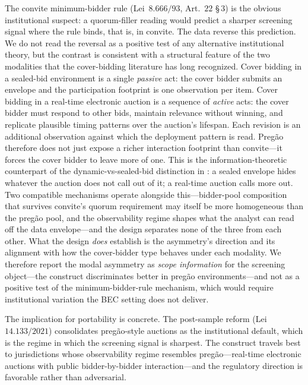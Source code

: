 The convite minimum-bidder rule
(Lei~$8.666/93$, Art.~$22$ \S\,$3$) is the obvious institutional
suspect: a quorum-filler reading would predict a sharper
screening signal where the rule binds, that is, in convite. The
data reverse this prediction. We do not read the reversal as a
positive test of any alternative institutional theory, but the
contrast is consistent with a structural feature of the two
modalities that the cover-bidding literature has long
recognized. Cover bidding in a sealed-bid environment is a
single \emph{passive} act: the cover bidder submits an envelope
and the participation footprint is one observation per item.
Cover bidding in a real-time electronic auction is a sequence
of \emph{active} acts: the cover bidder must respond to other
bids, maintain relevance without winning, and replicate
plausible timing patterns over the auction's lifespan. Each
revision is an additional observation against which the
deployment pattern is read. Pregão therefore does not just
expose a richer interaction footprint than convite---it forces
the cover bidder to leave more of one. This is the
information-theoretic counterpart of the dynamic-vs-sealed-bid
distinction in
\citet{marshall2012economics,asker2010leniency,athey2011comparing}:
a sealed envelope hides whatever the auction does not call out
of it; a real-time auction calls more out. Two compatible
mechanisms operate alongside this---bidder-pool composition
that survives convite's quorum requirement may itself be more
homogeneous than the pregão pool, and the observability regime
shapes what the analyst can read off the data envelope---and
the design separates none of the three from each other. What
the design \emph{does} establish is the asymmetry's direction
and its alignment with how the cover-bidder type behaves under
each modality. We therefore report the modal asymmetry as
\emph{scope information} for the screening object---the
construct discriminates better in pregão environments---and
not as a positive test of the minimum-bidder-rule mechanism,
which would require institutional variation the BEC setting
does not deliver.

The implication for portability is concrete. The post-sample
reform (Lei~$14.133/2021$) consolidates pregão-style auctions as
the institutional default, which is the regime in which the
screening signal is sharpest. The construct travels best to
jurisdictions whose observability regime resembles
pregão---real-time electronic auctions with public
bidder-by-bidder interaction---and the regulatory direction is
favorable rather than adversarial.
